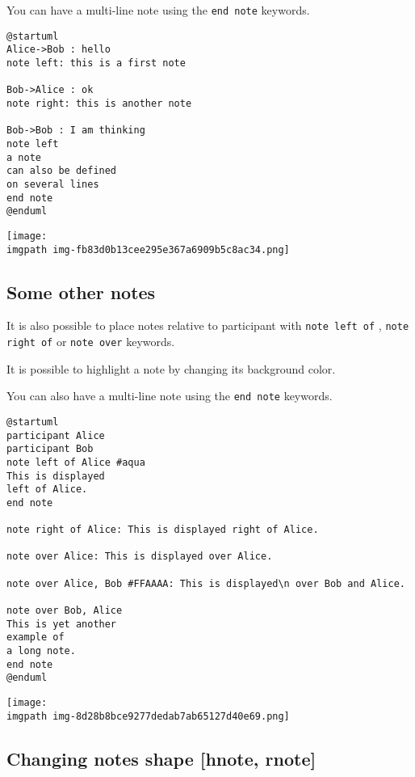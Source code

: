 You can have a multi-line note using the \texttt{end note}
keywords.


\begin{verbatim}
@startuml
Alice->Bob : hello
note left: this is a first note

Bob->Alice : ok
note right: this is another note

Bob->Bob : I am thinking
note left
a note
can also be defined
on several lines
end note
@enduml
\end{verbatim}
\begin{center}
\texttt{[image: \\imgpath img-fb83d0b13cee295e367a6909b5c8ac34.png]}
\end{center}


%
%
\subsection{Some other notes}




It is also possible to place notes relative to participant with \texttt{note left of} , \texttt{note right of} or \texttt{note over} keywords.


It is possible to highlight a note by changing its background color.


You can also have a multi-line note using the \texttt{end note} keywords.


\begin{verbatim}
@startuml
participant Alice
participant Bob
note left of Alice #aqua
This is displayed
left of Alice.
end note

note right of Alice: This is displayed right of Alice.

note over Alice: This is displayed over Alice.

note over Alice, Bob #FFAAAA: This is displayed\n over Bob and Alice.

note over Bob, Alice
This is yet another
example of
a long note.
end note
@enduml
\end{verbatim}
\begin{center}
\texttt{[image: \\imgpath img-8d28b8bce9277dedab7ab65127d40e69.png]}
\end{center}
%
%
\subsection{Changing notes shape [hnote, rnote]}


